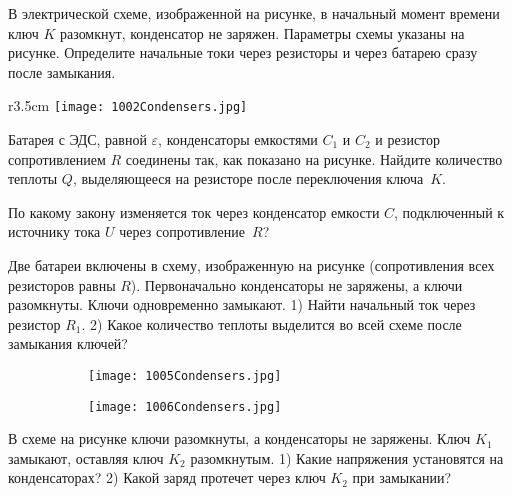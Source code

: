 \AddProb В электрической схеме, изображенной на рисунке, в начальный момент времени ключ $K$ разомкнут, конденсатор не заряжен. 
Параметры схемы указаны на рисунке. Определите начальные токи через резисторы и через батарею сразу после замыкания.

\begin{wrapfigure}{r}{3.5cm}
\texttt{[image: 1002Condensers.jpg]}
\end{wrapfigure}

\AddProb Батарея с ЭДС, равной {\Large $\varepsilon$}, конденсаторы емкостями $C_1$ и $C_2$ и резистор сопротивлением $R$ соединены так, как показано на рисунке. 
Найдите количество теплоты $Q$, выделяющееся на резисторе после переключения ключа~$K$.

\AddProb По какому закону изменяется ток через конденсатор емкости $C$, подключенный к источнику тока $U$ через сопротивление~$R$?

\AddProb Две батареи включены в схему, изображенную на рисунке (сопротивления всех резисторов равны $R$). 
Первоначально конденсаторы не заряжены, а ключи разомкнуты. Ключи одновременно замыкают. 
1) Найти начальный ток через резистор $R_1$. 2) Какое количество теплоты выделится во всей схеме после замыкания ключей?

\begin{figure}
	\begin{subfigure}{0.5\textwidth}
	\centering
	\texttt{[image: 1005Condensers.jpg]}
	\end{subfigure}
	\begin{subfigure}{0.5\textwidth}
	\centering
	\texttt{[image: 1006Condensers.jpg]}
	\end{subfigure}
\end{figure}

\AddProb В схеме на рисунке ключи разомкнуты, а конденсаторы не заряжены. Ключ $K_1$ замыкают, оставляя ключ $K_2$ разомкнутым. 
1) Какие напряжения установятся на конденсаторах? 2) Какой заряд протечет через ключ $K_2$ при замыкании?
